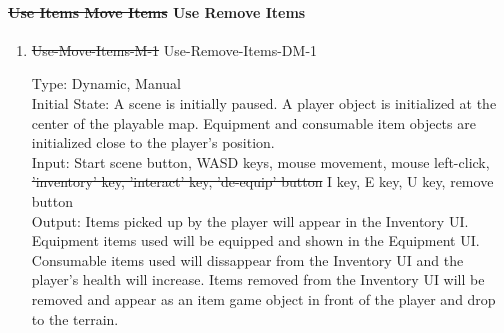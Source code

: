 \documentclass[12pt, titlepage]{article}
\DeclareRobustCommand{\hsout}[1]{\texorpdfstring{\sout{#1}}{#1}}
\newcounter{ftnum}
\begin{document}
\paragraph{\hsout{Use Items Move Items} {\color{magenta} Use Remove Items}}

\begin{enumerate}

\item{\sout{Use-Move-Items-M-1} {\color{magenta} Use-Remove-Items-DM-1} \\}  \label{F11-1}

Type: {\color{magenta} Dynamic, }Manual \\
					
Initial State: A scene is initially paused. A player object is initialized at the center of the playable map. Equipment and consumable item objects are initialized close to the player's position.\\
					
Input: Start scene button, WASD keys, mouse movement, mouse left-click, \sout{'inventory' key, 'interact' key, 'de-equip' button} {\color{magenta} I key, E key, U key, remove button}\\
					
Output: Items picked up by the player will appear in the Inventory UI. Equipment items used will be equipped and shown in the Equipment UI. Consumable items used will dissappear from the Inventory UI and the player's health will increase. Items removed from the Inventory UI will be removed and appear as an item game object in front of the player and drop to the terrain.\\
					

\end{enumerate}
\end{document}
